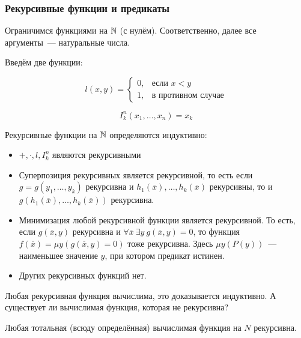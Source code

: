 
\subsubsection{Рекурсивные функции и предикаты}

Ограничимся функциями на ${\mathbb N}$ (с нулём). Соответственно, далее все аргументы~— натуральные числа.

Введём две функции:

\[
    l(x, y) = \begin{cases}0, & \text{если $x<y$}\\ 1, &\text{в противном случае}\end{cases}
\]

\[
    I^n_k(x_1, \ldots, x_n) = x_k 
\]

\begin{definition}
    Рекурсивные функции на ${\mathbb N}$ определяются индуктивно:
    \begin{itemize}
        \item $+, \cdot, l, I_k^n$ являются рекурсивными
        \item Суперпозиция рекурсивных является рекурсивной, то есть если $g = g(y_1, \ldots, y_k)$ рекурсивна и $h_1(\overline{x}), \ldots, h_k(\overline{x})$ рекурсивны, то и $g(h_1(\overline{x}), \ldots, h_k(\overline{x}))$ рекурсивна.
        \item Минимизация любой рекурсивной функции является рекурсивной. То есть, если $g(\overline{x}, y)$ рекурсивна и $\forall \overline{x}~\exists y~g(\overline{x}, y)=0$, то функция $f(\overline{x})=\mu y(g(\overline{x}, y)=0)$ тоже рекурсивна. Здесь $\mu y(P(y))$~— наименьшее значение $y$, при котором предикат истинен.
        \item Других рекурсивных функций нет.
    \end{itemize}
\end{definition}

\begin{remark}
    Любая рекурсивная функция вычислима, это доказывается индуктивно. А существует ли вычислимая функция, которая не рекурсивна?
\end{remark}

\begin{conjecture}
    Любая тотальная (всюду определённая) вычислимая функция на $N$ рекурсивна.
\end{conjecture}

